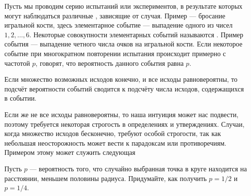 \documentclass[a4paper,12pt]{article}
\begin{document}
\setlength{\abovedisplayskip}{3pt}
\setlength{\belowdisplayskip}{-10pt}

{\small
Пусть мы проводим серию испытаний или экспериментов, в результате
которых могут наблюдаться различные , зависящие от случая.
Пример --- бросание игральной кости, здесь элементарное событие --- выпадение одного из чисел $1, 2,\ldots,6$.
Некоторые совокупности элементарных событий называются .
Пример события --- выпадение четного числа очков на игральной кости.
Если некоторое событие при многократном повторении испытания происходит примерно с частотой $p$, говорят, что вероятность данного события равна $p$.

Если множество возможных исходов конечно, и все исходы равновероятны,
то подсчёт вероятности событий сводится к подсчёту числа исходов, содержащихся в событии.

Если же не все исходы равновероятны, то наша интуиция может нас подвести,
поэтому требуется некоторая строгость в определениях и утверждениях.
Случаи, когда множество исходов бесконечно, требуют особой строгости,
так как небольшая неосторожность может вести к парадоксам или противоречиям.
Примером этому может служить следующая

}

    Пусть $p$ --- вероятность того, что случайно выбранная точка в круге находится на расстоянии, меньшем половины радиуса.
    Придумайте, как получить $p=1/2$ и $p=1/4$.
\end{document}
